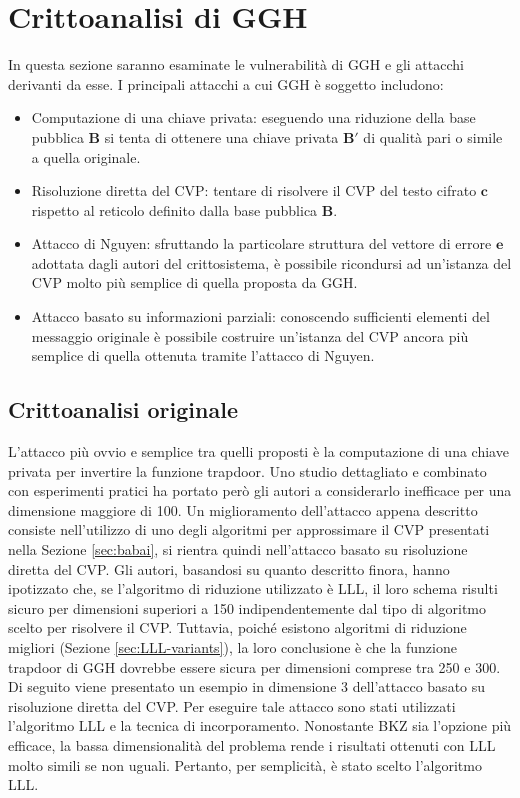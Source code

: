 \section{Crittoanalisi di GGH}
\label{sec:cryptoanalysis}
In questa sezione saranno esaminate le vulnerabilità di GGH e gli attacchi derivanti da esse. 
I principali attacchi a cui GGH è soggetto includono:
\begin{itemize}
\item Computazione di una chiave privata: eseguendo una riduzione della base pubblica $\mathbf{B}$
si tenta di ottenere una chiave privata $\mathbf{B}'$ di qualità pari o simile a quella originale. 
\item Risoluzione diretta del CVP: tentare di risolvere il CVP del testo cifrato $\mathbf{c}$ 
rispetto al reticolo definito dalla base pubblica $\mathbf{B}$. 
\item Attacco di Nguyen: sfruttando la particolare struttura del vettore di errore $\mathbf{e}$ 
adottata dagli autori del crittosistema, è possibile ricondursi ad un'istanza del CVP molto più 
semplice di quella proposta da GGH.
\item Attacco basato su informazioni parziali: conoscendo sufficienti elementi del messaggio
originale è possibile costruire un'istanza del CVP ancora più semplice di quella ottenuta
tramite l'attacco di Nguyen. 
\end{itemize}

\subsection{Crittoanalisi originale}
L'attacco più ovvio e semplice tra quelli proposti è la computazione di una chiave privata per invertire la
funzione trapdoor. Uno studio dettagliato e combinato con esperimenti pratici ha portato però 
gli autori a considerarlo inefficace per una dimensione maggiore di 100.
Un miglioramento dell'attacco appena descritto consiste nell'utilizzo di uno degli algoritmi
per approssimare il CVP presentati nella Sezione \ref{sec:babai}, si rientra quindi 
nell'attacco basato su risoluzione diretta del CVP. 
Gli autori, basandosi su quanto descritto finora, hanno ipotizzato che, se l'algoritmo di 
riduzione utilizzato è LLL, il loro schema risulti sicuro per dimensioni superiori a 150
indipendentemente dal tipo di algoritmo scelto per risolvere il CVP. 
Tuttavia, poiché esistono algoritmi di riduzione migliori (Sezione \ref{sec:LLL-variants}), 
la loro conclusione è che la funzione trapdoor di GGH dovrebbe essere sicura per dimensioni 
comprese tra 250 e 300. \\
Di seguito viene presentato un esempio in dimensione 3 dell'attacco basato su 
risoluzione diretta del CVP. 
Per eseguire tale attacco sono stati utilizzati l'algoritmo LLL e la tecnica di incorporamento. 
Nonostante BKZ sia l'opzione più efficace, la bassa 
dimensionalità del problema rende i risultati ottenuti con LLL molto simili se non uguali. 
Pertanto, per semplicità, è stato scelto l'algoritmo LLL.


